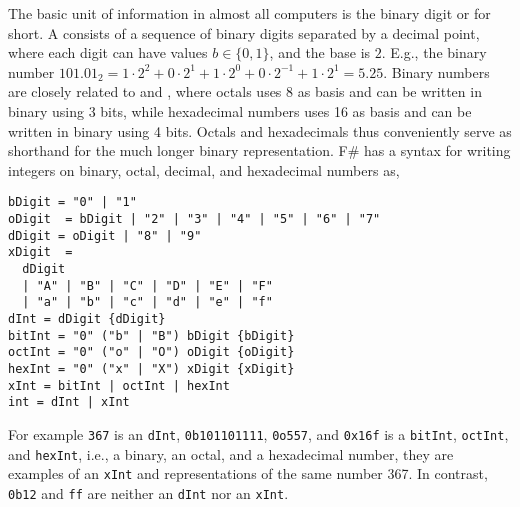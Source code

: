 The basic unit of information in almost all computers is the binary digit or  for short. A  consists of a sequence of binary digits separated by a decimal point, where each digit can have values $b \in \{0,1\}$, and the base is $2$. E.g., the binary number $101.01_2 = 1\cdot 2^2+0\cdot 2^1+1\cdot 2^0+0\cdot 2^{-1}+1\cdot 2^1=5.25$. Binary numbers are closely related to  and , where octals uses 8 as basis and can be written in binary using 3 bits, while hexadecimal numbers uses 16 as basis and can be written in binary using 4 bits. Octals and hexadecimals thus conveniently serve as shorthand for the much longer binary representation. F\# has a syntax for writing integers on binary, octal, decimal, and hexadecimal numbers as,
%
\begin{lstlisting}[language=EBNF]
bDigit = "0" | "1"
oDigit  = bDigit | "2" | "3" | "4" | "5" | "6" | "7"
dDigit = oDigit | "8" | "9"
xDigit  = 
  dDigit 
  | "A" | "B" | "C" | "D" | "E" | "F" 
  | "a" | "b" | "c" | "d" | "e" | "f" 
dInt = dDigit {dDigit}
bitInt = "0" ("b" | "B") bDigit {bDigit}
octInt = "0" ("o" | "O") oDigit {oDigit}
hexInt = "0" ("x" | "X") xDigit {xDigit}
xInt = bitInt | octInt | hexInt
int = dInt | xInt
\end{lstlisting}
%
For example \lstinline!367! is an \lstinline[language=EBNF]!dInt!, \lstinline!0b101101111!, \lstinline!0o557!, and \lstinline!0x16f! is a \lstinline[language=EBNF]!bitInt!, \lstinline[language=EBNF]!octInt!, and \lstinline[language=EBNF]!hexInt!, i.e., a binary, an octal, and a hexadecimal number, they are examples of an \lstinline[language=EBNF]!xInt! and representations of the same number 367. In contrast, \lstinline!0b12! and \lstinline!ff! are neither an \lstinline[language=EBNF]!dInt! nor an \lstinline[language=EBNF]!xInt!.


